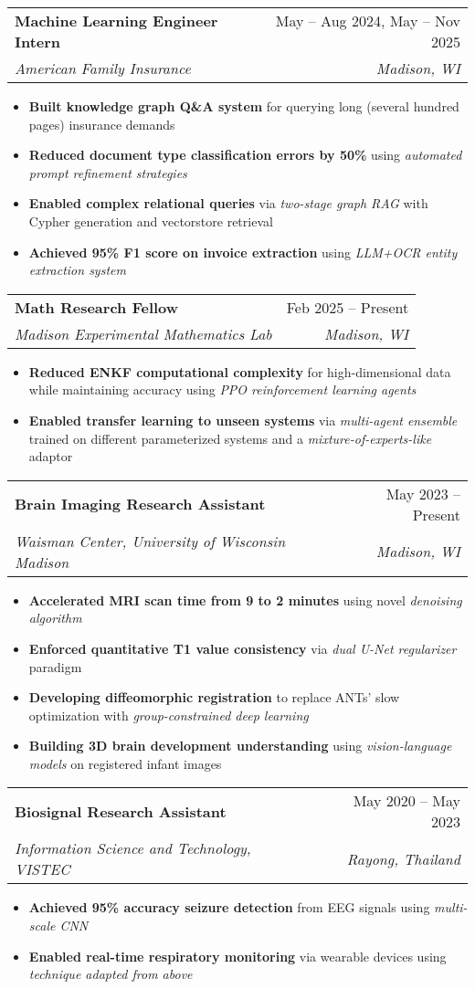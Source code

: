 \documentclass[letterpaper]{article}
\makeatletter
\newcommand{\resumeItem}[1]{
  \item\small{
    {#1 \vspace{-3pt}}
  }
}
\newcommand{\resumeSubheading}[4]{
  \vspace{-2pt}\item
    \begin{tabular*}{0.97\textwidth}[t]{l@{\extracolsep{\fill}}r}
      \textbf{#1} & #2 \\
      \textit{\small#3} & \textit{\small #4} \\
    \end{tabular*}\vspace{-7pt}
}
\newcommand{\resumeItemListStart}{\begin{itemize}}
\newcommand{\resumeItemListEnd}{\end{itemize}\vspace{-7pt}}
\makeatother
\begin{document}
    \resumeSubheading
      {Machine Learning Engineer Intern}{May -- Aug 2024, May -- Nov 2025}
      {American Family Insurance}{Madison, WI}
      \resumeItemListStart
        \resumeItem{\textbf{Built knowledge graph Q\&A system} for querying long (several hundred pages) insurance demands}
        \resumeItem{\textbf{Reduced document type classification errors by 50\%} using \textit{automated prompt refinement strategies}}
        \resumeItem{\textbf{Enabled complex relational queries} via \textit{two-stage graph RAG} with Cypher generation and vectorstore retrieval}
        \resumeItem{\textbf{Achieved 95\% F1 score on invoice extraction} using \textit{LLM+OCR entity extraction system}}
      \resumeItemListEnd

    \resumeSubheading
      {Math Research Fellow}{Feb 2025 -- Present}
      {Madison Experimental Mathematics Lab}{Madison, WI}
      \resumeItemListStart
        \resumeItem{\textbf{Reduced ENKF computational complexity} for high-dimensional data while maintaining accuracy using \textit{PPO reinforcement learning agents}}
        \resumeItem{\textbf{Enabled transfer learning to unseen systems} via \textit{multi-agent ensemble} trained on different parameterized systems and a \textit{mixture-of-experts-like} adaptor}
      \resumeItemListEnd

    \resumeSubheading
      {Brain Imaging Research Assistant}{May 2023 -- Present}
      {Waisman Center, University of Wisconsin Madison}{Madison, WI}
      \resumeItemListStart
        \resumeItem{\textbf{Accelerated MRI scan time from 9 to 2 minutes} using novel \textit{denoising algorithm}}
        \resumeItem{\textbf{Enforced quantitative T1 value consistency} via \textit{dual U-Net regularizer} paradigm}
        \resumeItem{\textbf{Developing diffeomorphic registration} to replace ANTs' slow optimization with \textit{group-constrained deep learning}}
        \resumeItem{\textbf{Building 3D brain development understanding} using \textit{vision-language models} on registered infant images}
    \resumeItemListEnd

    \resumeSubheading
      {Biosignal Research Assistant}{May 2020 -- May 2023}
      {Information Science and Technology, VISTEC}{Rayong, Thailand}
      \resumeItemListStart
        \resumeItem{\textbf{Achieved 95\% accuracy seizure detection} from EEG signals using \textit{multi-scale CNN}}
        \resumeItem{\textbf{Enabled real-time respiratory monitoring} via wearable devices using \textit{technique adapted from above}}
      \resumeItemListEnd
\end{document}
